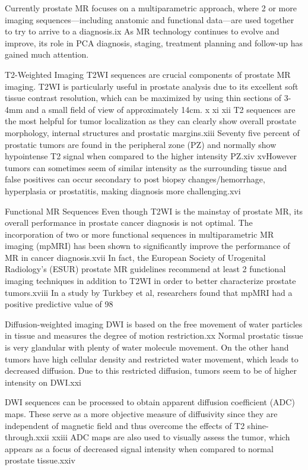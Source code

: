  Currently prostate MR focuses on a multiparametric approach, where 2 or more imaging sequences—including anatomic and functional data—are used together to try to arrive to a diagnosis.ix As MR technology continues to evolve and improve, its role in PCA diagnosis, staging, treatment planning and follow-up has gained much attention.

 T2-Weighted Imaging
 T2WI sequences are crucial components of prostate MR imaging.  T2WI is particularly useful in prostate analysis due to its excellent soft tissue contrast resolution, which can be maximized by using thin sections of 3-4mm and a small field of view of approximately 14cm. x xi xii T2 sequences are the most helpful for tumor localization as they can clearly show overall prostate morphology, internal structures and prostatic margins.xiii Seventy five percent of prostatic tumors are found in the peripheral zone (PZ) and normally show hypointense T2 signal when compared to the higher intensity PZ.xiv xvHowever tumors can sometimes seem of similar intensity as the surrounding tissue and false positives can occur secondary to post biopsy changes/hemorrhage, hyperplasia or prostatitis, making diagnosis more challenging.xvi 

 Functional MR Sequences
 Even though T2WI is the mainstay of prostate MR, its overall performance in prostate cancer diagnosis is not optimal. The incorporation of two or more functional sequences in multiparametric MR imaging (mpMRI) has been shown to significantly improve the performance of MR in cancer diagnosis.xvii In fact, the European Society of Urogenital Radiology’s (ESUR) prostate MR guidelines recommend at least 2 functional imaging techniques in addition to T2WI in order to better characterize prostate tumors.xviii  In a study by Turkbey et al, researchers found that mpMRI had a positive predictive value of 98%

 Diffusion-weighted imaging
 DWI is based on the free movement of water particles in tissue and measures the degree of motion restriction.xx Normal prostatic tissue is very glandular with plenty of water molecule movement. On the other hand tumors have high cellular density and restricted water movement, which leads to decreased diffusion. Due to this restricted diffusion, tumors seem to be of higher intensity on DWI.xxi 

 DWI sequences can be processed to obtain apparent diffusion coefficient (ADC) maps. These serve as a more objective measure of diffusivity since they are independent of magnetic field and thus overcome the effects of T2 shine-through.xxii xxiii ADC maps are also used to visually assess the tumor, which appears as a focus of decreased signal intensity when compared to normal prostate tissue.xxiv 

